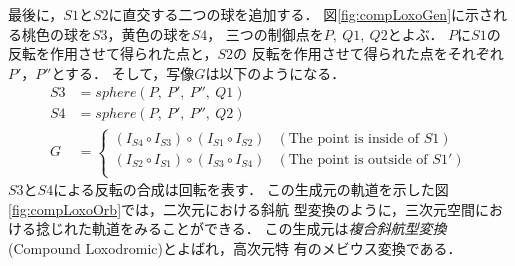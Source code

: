 最後に，$S1$と$S2$に直交する二つの球を追加する．
図\ref{fig:compLoxoGen}に示される桃色の球を$S3$，黄色の球を$S4$，
三つの制御点を$P,~Q1,~Q2$とよぶ．
$P$に$S1$の反転を作用させて得られた点と，$S2$の
反転を作用させて得られた点をそれぞれ$P'$，$P''$とする．
そして，写像$G$は以下のようになる．
\begin{align*}
S3 &= sphere(P,~P',~P'',~Q1) \\
S4 &= sphere(P,~P',~P'',~Q2) \\
G &=
\begin{cases}
 (I_{S4} \circ I_{S3}) \circ (I_{S1} \circ I_{S2}) & (\text{The point is inside of } S1) \\
 (I_{S2} \circ I_{S1}) \circ (I_{S3} \circ I_{S4}) & (\text{The point is
 outside of } S1')\\
\end{cases}
\end{align*}
$S3$と$S4$による反転の合成は回転を表す．
この生成元の軌道を示した図\ref{fig:compLoxoOrb}では，二次元における斜航
型変換のように，三次元空間における捻じれた軌道をみることができる．
この生成元は\emph{複合斜航型変換}(Compound Loxodromic)とよばれ，高次元特
有のメビウス変換である．

